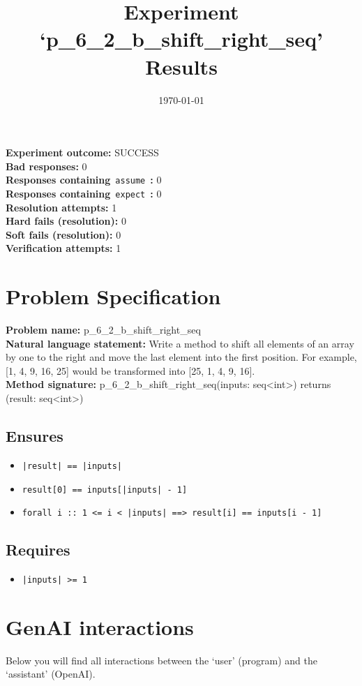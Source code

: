 \documentclass{article}
\begin{document}
\title{Experiment `p\_6\_2\_b\_shift\_right\_seq' Results}
\author{\today}
\date{}
\maketitle
\textbf{Experiment outcome: }SUCCESS
\\\textbf{Bad responses: }0
\\\textbf{Responses containing}~\texttt{assume}~\textbf{: }0
\\\textbf{Responses containing}~\texttt{expect}~\textbf{: }0
\\\textbf{Resolution attempts: }1
\\\textbf{Hard fails (resolution): }0
\\\textbf{Soft fails (resolution): }0
\\\textbf{Verification attempts: }1
\section*{Problem Specification}
\textbf{Problem name: }p\_6\_2\_b\_shift\_right\_seq
\\\textbf{Natural language statement: }Write a method to shift all elements of an array by one to the right and move the last element into the first position. For example, [1, 4, 9, 16, 25] would be transformed into [25, 1, 4, 9, 16].
\\\textbf{Method signature: }p\_6\_2\_b\_shift\_right\_seq(inputs: seq<int>) returns (result: seq<int>)
\subsection*{Ensures}
\begin{itemize}
\item \texttt{|result| == |inputs|}
\item \texttt{result[0] == inputs[|inputs| - 1]}
\item \texttt{forall i :: 1 <= i < |inputs| ==> result[i] == inputs[i - 1]}
\end{itemize}
\subsection*{Requires}
\begin{itemize}
\item \texttt{|inputs| >= 1}
\end{itemize}
\clearpage
\section*{GenAI interactions}
Below you will find all interactions between the `user' (program) and the `assistant' (OpenAI).
\end{document}
